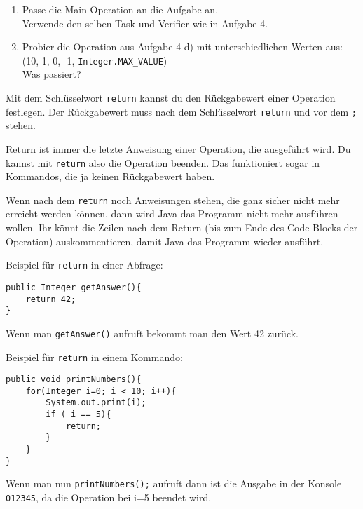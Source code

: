 
\begin{enumerate}
	\item
		Passe die Main Operation an die Aufgabe an.\\
		Verwende den selben Task und Verifier wie in Aufgabe 4.

	\item
		Probier die Operation aus Aufgabe 4 d) mit unterschiedlichen Werten aus: (10, 1, 0, -1, \lstinline{Integer.MAX_VALUE}) \\
		Was passiert?
\end{enumerate}

	
\begin{Infobox}[Return]
	Mit dem Schlüsselwort \lstinline{return} kannst du den Rückgabewert einer Operation festlegen.
	Der Rückgabewert muss nach dem Schlüsselwort \lstinline{return} und vor dem \lstinline{;} stehen.

	Return ist immer die letzte Anweisung einer Operation, die ausgeführt wird.
	Du kannst mit \lstinline{return} also die Operation beenden.
	Das funktioniert sogar in Kommandos, die ja keinen Rückgabewert haben.

	Wenn nach dem \lstinline{return} noch Anweisungen stehen, die ganz sicher nicht mehr erreicht werden können, dann wird Java das Programm nicht mehr ausführen wollen.
	Ihr könnt die Zeilen nach dem Return (bis zum Ende des Code-Blocks der Operation) auskommentieren, damit Java das Programm wieder ausführt.

	Beispiel für \lstinline{return} in einer Abfrage:
	
	\begin{lstlisting}[xleftmargin=0.5cm]
public Integer getAnswer(){
    return 42;
}
	\end{lstlisting}

	Wenn man \lstinline{getAnswer()} aufruft bekommt man den Wert 42 zurück.

	Beispiel für \lstinline{return} in einem Kommando:

	\begin{lstlisting}[xleftmargin=0.5cm]
public void printNumbers(){
    for(Integer i=0; i < 10; i++){
        System.out.print(i);
        if ( i == 5){
            return;
        }
    }
}
	\end{lstlisting}

	Wenn man nun \lstinline{printNumbers();} aufruft dann ist die Ausgabe in der Konsole \lstinline{012345}, da die Operation bei i=5 beendet wird.
\end{Infobox}


